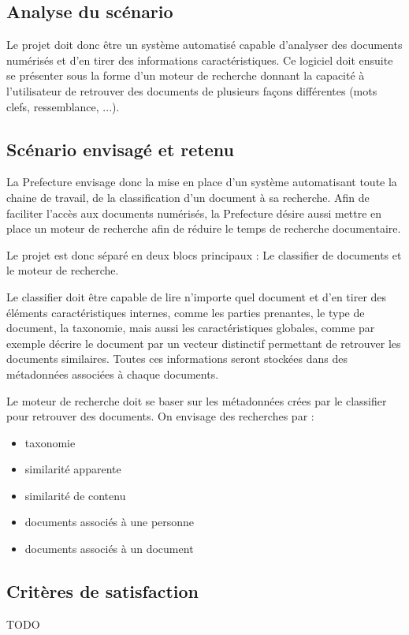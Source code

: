 
\subsection {Analyse du scénario}
Le projet doit donc être un système automatisé capable d'analyser des documents numérisés et d'en tirer des informations caractéristiques.
Ce logiciel doit ensuite se présenter sous la forme d'un moteur de recherche donnant la capacité à l'utilisateur de retrouver des documents de plusieurs façons différentes (mots clefs, ressemblance, ...).



\subsection {Scénario envisagé et retenu}
La Prefecture envisage donc la mise en place d'un système automatisant toute la chaine de travail, de la classification d'un document à sa recherche.
Afin de faciliter l'accès aux documents numérisés, la Prefecture désire aussi mettre en place un moteur de recherche afin de réduire le temps de recherche documentaire.

Le projet est donc séparé en deux blocs principaux :
Le classifier de documents et le moteur de recherche.

Le classifier doit être capable de lire n'importe quel document et d'en tirer des éléments caractéristiques internes, comme les parties prenantes, le type de document, la taxonomie, mais aussi les caractéristiques globales, comme par exemple décrire le document par un vecteur distinctif permettant de retrouver les documents similaires.
Toutes ces informations seront stockées dans des métadonnées associées à chaque documents.


Le moteur de recherche doit se baser sur les métadonnées crées par le classifier pour retrouver des documents.
On envisage des recherches par :
\begin {itemize}
\item taxonomie
\item similarité apparente
\item similarité de contenu
\item documents associés à une personne
\item documents associés à un document
\end {itemize}



\subsection {Critères de satisfaction}

TODO








